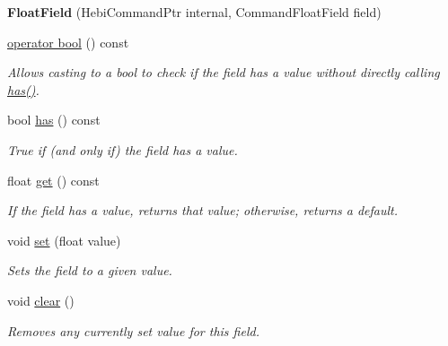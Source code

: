 \begin{DoxyCompactItemize}
\item 
\mbox{\label{classhebi_1_1Command_1_1FloatField_a4eb2e80bc5c55e9dc87bba49430278c5}} 
{\bfseries Float\+Field} (Hebi\+Command\+Ptr internal, Command\+Float\+Field field)
\item 
\hyperlink{classhebi_1_1Command_1_1FloatField_a3fcbc1334c39f87cd174fd455f3b932d}{operator bool} () const
\begin{DoxyCompactList}\small\item\em Allows casting to a bool to check if the field has a value without directly calling {\ttfamily \hyperlink{classhebi_1_1Command_1_1FloatField_a80e25ed684a201a7b5f28a9d449a448a}{has()}}. \end{DoxyCompactList}\item 
\mbox{\label{classhebi_1_1Command_1_1FloatField_a80e25ed684a201a7b5f28a9d449a448a}} 
bool \hyperlink{classhebi_1_1Command_1_1FloatField_a80e25ed684a201a7b5f28a9d449a448a}{has} () const
\begin{DoxyCompactList}\small\item\em True if (and only if) the field has a value. \end{DoxyCompactList}\item 
\mbox{\label{classhebi_1_1Command_1_1FloatField_a015887f707ce563e8b76b48f37bda222}} 
float \hyperlink{classhebi_1_1Command_1_1FloatField_a015887f707ce563e8b76b48f37bda222}{get} () const
\begin{DoxyCompactList}\small\item\em If the field has a value, returns that value; otherwise, returns a default. \end{DoxyCompactList}\item 
\mbox{\label{classhebi_1_1Command_1_1FloatField_aa69fab0a635374ad6e7408c6bebe9f51}} 
void \hyperlink{classhebi_1_1Command_1_1FloatField_aa69fab0a635374ad6e7408c6bebe9f51}{set} (float value)
\begin{DoxyCompactList}\small\item\em Sets the field to a given value. \end{DoxyCompactList}\item 
\mbox{\label{classhebi_1_1Command_1_1FloatField_a2ba855477fe5a19a90da2b88ed716f13}} 
void \hyperlink{classhebi_1_1Command_1_1FloatField_a2ba855477fe5a19a90da2b88ed716f13}{clear} ()
\begin{DoxyCompactList}\small\item\em Removes any currently set value for this field. \end{DoxyCompactList}\end{DoxyCompactItemize}


